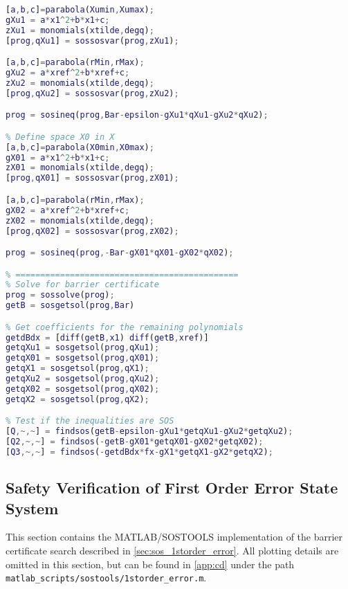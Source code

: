 \begin{lstlisting}[language=matlab]
% Define space Xu in X
[a,b,c]=parabola(Xumin,Xumax);
gXu1 = a*x1^2+b*x1+c;
zXu1 = monomials(xtilde,degq);
[prog,qXu1] = sossosvar(prog,zXu1);

[a,b,c]=parabola(rMin,rMax);
gXu2 = a*xref^2+b*xref+c;
zXu2 = monomials(xtilde,degq);
[prog,qXu2] = sossosvar(prog,zXu2);

prog = sosineq(prog,Bar-epsilon-gXu1*qXu1-gXu2*qXu2);

% Define space X0 in X
[a,b,c]=parabola(X0min,X0max);
gX01 = a*x1^2+b*x1+c;
zX01 = monomials(xtilde,degq);
[prog,qX01] = sossosvar(prog,zX01);

[a,b,c]=parabola(rMin,rMax);
gX02 = a*xref^2+b*xref+c;
zX02 = monomials(xtilde,degq);
[prog,qX02] = sossosvar(prog,zX02);

prog = sosineq(prog,-Bar-gX01*qX01-gX02*qX02);

% =============================================
% Solve for barrier certificate
prog = sossolve(prog);
getB = sosgetsol(prog,Bar)

% Get coefficients for the remaining polynomials
getdBdx = [diff(getB,x1) diff(getB,xref)]
getqXu1 = sosgetsol(prog,qXu1);
getqX01 = sosgetsol(prog,qX01);
getqX1 = sosgetsol(prog,qX1);
getqXu2 = sosgetsol(prog,qXu2);
getqX02 = sosgetsol(prog,qX02);
getqX2 = sosgetsol(prog,qX2);

% Test if the inequalities are SOS
[Q,~,~] = findsos(getB-epsilon-gXu1*getqXu1-gXu2*getqXu2);
[Q2,~,~] = findsos(-getB-gX01*getqX01-gX02*getqX02);
[Q3,~,~] = findsos(-getdBdx*fx-gX1*getqX1-gX2*getqX2);
\end{lstlisting}

\subsection{Safety Verification of First Order Error State System}\label{app:sos_errorstate_firstorder}
This section contains the MATLAB/SOSTOOLS implementation of the barrier certificate search described in \autoref{sec:sos_1storder_error}. All plotting details are omitted in this section, but can be found in \autoref{app:cd} under the path \texttt{matlab\_scripts/sostools/1storder\_error.m}.

